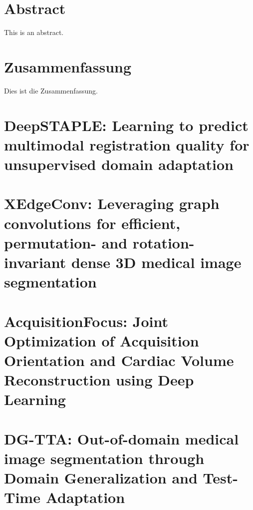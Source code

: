 \documentclass[
	11pt,
	a4paper,
	twoside,
	headsepline,
	titlepage,
	DIV=11,
	BCOR=12mm,
	captions=tableheading,
	chapterprefix=on,
	numbers=noenddot,
]{scrbook}
\begin{document}
    \thispagestyle{headings}
    

    \enlargethispage{1\baselineskip}
    \setcounter{page}{1}

    \chapter*{Abstract}
        This is an abstract.

    \chapter*{Zusammenfassung}
        Dies ist die Zusammenfassung.
    \cleardoublepage

    \tableofcontents
    \cleardoublepage

    
    

    \chapter[DeepSTAPLE]{DeepSTAPLE: Learning to predict multimodal registration quality for unsupervised domain adaptation}
        
    \chapter[XEdgeConv]{XEdgeConv: Leveraging graph convolutions for efficient, permutation- and rotation-invariant dense 3D medical image segmentation}
        
    \chapter[AcquisitionFocus]{AcquisitionFocus: Joint Optimization of Acquisition Orientation and Cardiac Volume Reconstruction using Deep Learning}
        

    \chapter[DG-TTA]{DG-TTA: Out-of-domain medical image segmentation through Domain Generalization and Test-Time Adaptation}
        

    

    \printbibliography[heading=bibintoc]
\end{document}

